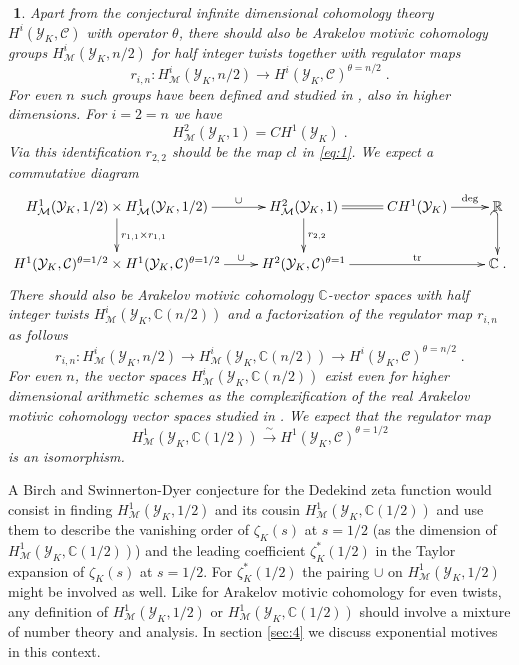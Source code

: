 \documentclass[12pt,leqno]{article}
\newcommand{\C}{{\mathbb{C}}}
\newcommand{\R}{{\mathbb{R}}}
\newcommand{\tr}{\mathrm{tr}}
\newcommand{\Ch}{{\mathcal C}}
\newcommand{\Mh}{{\mathcal M}}
\newcommand{\Yh}{\mathcal{Y}}
\newcommand{\silo}{\xrightarrow{\,\sim\,}}
\newtheorem{punkt}[theorem]{$\!\!$}
\begin{document}
\begin{punkt} \label{t2.13} \em
Apart from the conjectural infinite dimensional cohomology theory $H^i (\Yh_K , \Ch)$ with operator $\theta$, there should also be Arakelov motivic cohomology groups $H^i_{\Mh} (\Yh_K , n/2)$ for half integer twists together with regulator maps
\[
r_{i,n} : H^i_{\Mh} (\Yh_K , n / 2) \longrightarrow H^i (\Yh_K , \Ch)^{\theta = n / 2} \; .
\]
For even $n$ such groups have been defined and studied in \cite{Schol}, \cite{HSchol} also in higher dimensions. For $i = 2 = n$ we have
\[
H^2_{\Mh} (\Yh_K , 1) = CH^1 (\Yh_K) \; .
\]
Via this identification $r_{2,2}$ should be the map $cl$ in \eqref{eq:1}. We expect a commutative diagram
\[
\xymatrix{
H^1_{\Mh} (\Yh_K , 1/2) \times H^1_{\Mh} (\Yh_K , 1/2) \ar[d]^{r_{1,1} \times r_{1,1}} \ar[r]^-{\cup} & H^2_{\Mh} (\Yh_K , 1) \ar[d]^{r_{2,2}} \ar@{=}[r] & CH^1 (\Yh_K) \ar[r]^-{\deg} & \R \ar@{_{(}->}[d] \\
H^1 (\Yh_K , \Ch)^{\theta = 1/2} \times H^1 (\Yh_K , \Ch)^{\theta = 1/2} \ar[r]^-{\cup} & H^2 (\Yh_K , \Ch)^{\theta = 1} \ar[rr]^-{\tr} && \C \; .
}
\]
There should also be Arakelov motivic cohomology $\C$-vector spaces with half integer twists $H^i_{\Mh} (\Yh_K , \C (n/2))$ and a factorization of the regulator map $r_{i,n}$ as follows
\[
r_{i,n} : H^i_{\Mh} (\Yh_K , n/2) \longrightarrow H^i_{\Mh} (\Yh_K , \C (n/2)) \longrightarrow H^i (\Yh_K , \Ch)^{\theta = n/2} \; .
\]
For even $n$, the vector spaces $H^i_{\Mh} (\Yh_K , \C (n/2))$ exist even for higher dimensional arithmetic schemes as the complexification of the real Arakelov motivic cohomology vector spaces studied in \cite{Schol}. We expect that the regulator map
\[
H^1_{\Mh} (\Yh_K , \C (1/2)) \silo H^1 (\Yh_K , \Ch)^{\theta = 1/2}
\]
is an isomorphism. 
\end{punkt}

A Birch and Swinnerton-Dyer conjecture for the Dedekind zeta function would consist in finding $H^1_{\Mh} (\Yh_K , 1/2)$ and its cousin $H^1_{\Mh} (\Yh_K , \C (1/2))$ and use them to describe the vanishing order of $\zeta_K (s)$ at $s = 1/2$ (as the dimension of $H^1_{\Mh} (\Yh_K , \C (1/2))$) and the leading coefficient $\zeta^*_K (1/2)$ in the Taylor expansion of $\zeta_K (s)$ at $s = 1/2$. For $\zeta^*_K (1/2)$ the pairing $\cup$ on $H^1_{\Mh} (\Yh_K , 1/2)$ might be involved as well. Like for Arakelov motivic cohomology for even twists, any definition of $H^1_{\Mh} (\Yh_K , 1/2)$ or $H^1_{\Mh} (\Yh_K , \C (1/2))$ should involve a mixture of number theory and analysis. In section \ref{sec:4} we discuss exponential motives in this context. 
\end{document}
